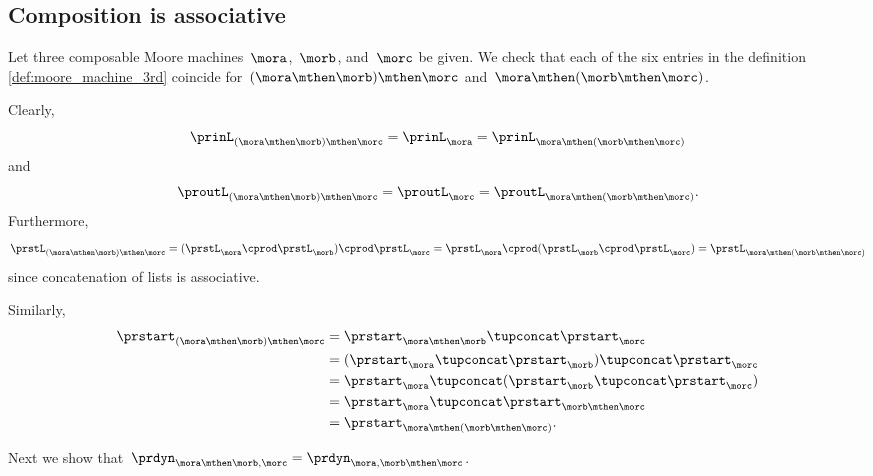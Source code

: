 \subsection{Composition is associative}

Let three composable Moore machines~$\mora$,~$\morb$, and~$\morc$ be given.
We check that each of the six entries in the definition \cref{def:moore_machine_3rd} coincide for~$(\mora \mthen \morb) \mthen \morc$ and~$\mora \mthen (\morb \mthen \morc)$.

Clearly,
\begin{equation}
    \prinL_{(\mora \mthen \morb)\mthen \morc}  = \prinL_{\mora} =\prinL_{\mora \mthen (\morb \mthen \morc)}
\end{equation}
and
\begin{equation}
    \proutL_{(\mora \mthen \morb)\mthen \morc}  =\proutL_\morc = \proutL_{\mora \mthen (\morb \mthen \morc)}.
\end{equation}
Furthermore,
\begin{equation}
    \prstL_{(\mora \mthen \morb)\mthen \morc} =  (\prstL_{\mora} \cprod \prstL_{\morb}) \cprod  \prstL_{\morc}  =  \prstL_{\mora} \cprod (\prstL_{\morb} \cprod  \prstL_{\morc}) =\prstL_{\mora \mthen (\morb \mthen \morc)}
\end{equation}
since concatenation of lists is associative.

Similarly,
\begin{align*}
    \prstart_{(\mora \mthen \morb)\mthen \morc} & = \prstart_{\mora \mthen \morb} \tupconcat \prstart_{\morc} \\
                                                & =  (\prstart_{\mora } \tupconcat \prstart_{\morb}) \tupconcat \prstart_{\morc} \\
                                                & = \prstart_{\mora } \tupconcat (\prstart_{\morb} \tupconcat \prstart_{\morc}) \\
                                                & = \prstart_{\mora } \tupconcat \prstart_{ \morb \mthen\morc} \\
                                                & = \prstart_{\mora \mthen (\morb \mthen \morc)}.
\end{align*}

Next we show that~$\prdyn_{\mora \mthen \morb, \morc} = \prdyn_{\mora, \morb \mthen \morc}$.


